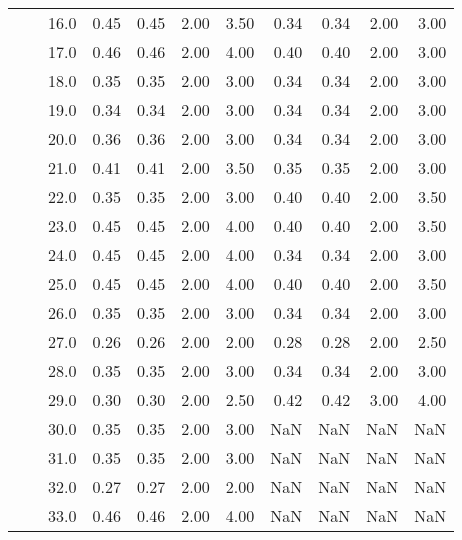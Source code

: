 \begin{tabular}{lllrrrrrrrr}
       &     & 16.0 &       0.45 &      0.45 & 2.00 &   3.50 &       0.34 &      0.34 & 2.00 &   3.00 \\
       &     & 17.0 &       0.46 &      0.46 & 2.00 &   4.00 &       0.40 &      0.40 & 2.00 &   3.00 \\
       &     & 18.0 &       0.35 &      0.35 & 2.00 &   3.00 &       0.34 &      0.34 & 2.00 &   3.00 \\
       &     & 19.0 &       0.34 &      0.34 & 2.00 &   3.00 &       0.34 &      0.34 & 2.00 &   3.00 \\
       &     & 20.0 &       0.36 &      0.36 & 2.00 &   3.00 &       0.34 &      0.34 & 2.00 &   3.00 \\
       &     & 21.0 &       0.41 &      0.41 & 2.00 &   3.50 &       0.35 &      0.35 & 2.00 &   3.00 \\
       &     & 22.0 &       0.35 &      0.35 & 2.00 &   3.00 &       0.40 &      0.40 & 2.00 &   3.50 \\
       &     & 23.0 &       0.45 &      0.45 & 2.00 &   4.00 &       0.40 &      0.40 & 2.00 &   3.50 \\
       &     & 24.0 &       0.45 &      0.45 & 2.00 &   4.00 &       0.34 &      0.34 & 2.00 &   3.00 \\
       &     & 25.0 &       0.45 &      0.45 & 2.00 &   4.00 &       0.40 &      0.40 & 2.00 &   3.50 \\
       &     & 26.0 &       0.35 &      0.35 & 2.00 &   3.00 &       0.34 &      0.34 & 2.00 &   3.00 \\
       &     & 27.0 &       0.26 &      0.26 & 2.00 &   2.00 &       0.28 &      0.28 & 2.00 &   2.50 \\
       &     & 28.0 &       0.35 &      0.35 & 2.00 &   3.00 &       0.34 &      0.34 & 2.00 &   3.00 \\
       &     & 29.0 &       0.30 &      0.30 & 2.00 &   2.50 &       0.42 &      0.42 & 3.00 &   4.00 \\
       &     & 30.0 &       0.35 &      0.35 & 2.00 &   3.00 &        NaN &       NaN &  NaN &    NaN \\
       &     & 31.0 &       0.35 &      0.35 & 2.00 &   3.00 &        NaN &       NaN &  NaN &    NaN \\
       &     & 32.0 &       0.27 &      0.27 & 2.00 &   2.00 &        NaN &       NaN &  NaN &    NaN \\
       &     & 33.0 &       0.46 &      0.46 & 2.00 &   4.00 &        NaN &       NaN &  NaN &    NaN \\

\end{tabular}
